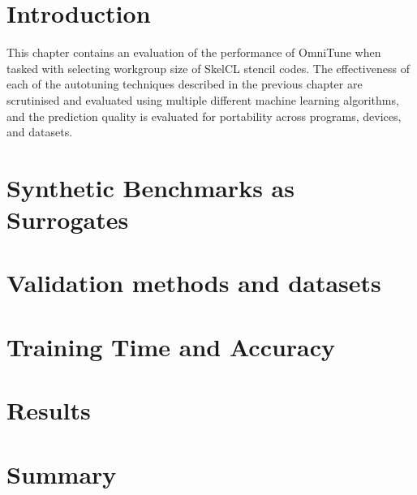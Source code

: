 \section{Introduction}

This chapter contains an evaluation of the performance of OmniTune
when tasked with selecting workgroup size of SkelCL stencil codes. The
effectiveness of each of the autotuning techniques described in the
previous chapter are scrutinised and evaluated using multiple
different machine learning algorithms, and the prediction quality is
evaluated for portability across programs, devices, and datasets.

\section{Synthetic Benchmarks as Surrogates}



\section{Validation methods and datasets}

\section{Training Time and Accuracy}

\section{Results}

\section{Summary}

